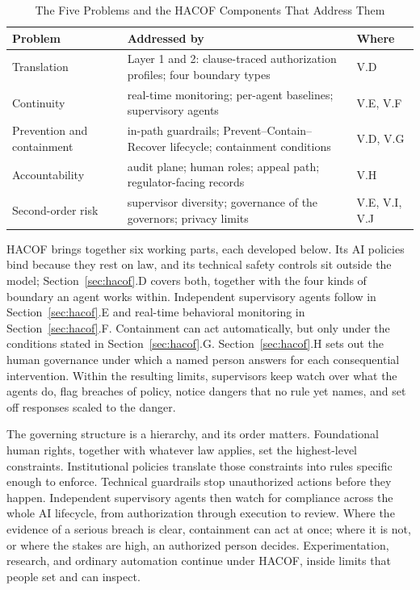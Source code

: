 \documentclass[journal]{IEEEtran}
\newcommand{\hacof}{HACOF}
\begin{document}
\begin{table}[!t]
\caption{The Five Problems and the \hacof{} Components That Address Them}
\label{tab:problems}
\centering
\footnotesize
\setlength{\tabcolsep}{3pt}
\begin{tabular}{>{\raggedright\arraybackslash}p{1.9cm}>{\raggedright\arraybackslash}p{3.6cm}>{\raggedright\arraybackslash}p{1.6cm}}
\toprule
\rowcolor{darkblue!15}
\textbf{Problem} & \textbf{Addressed by} & \textbf{Where} \\
\midrule
Translation & Layer 1 and 2: clause-traced authorization profiles; four boundary types & V.D \\
\rowcolor{darkblue!5}
Continuity & real-time monitoring; per-agent baselines; supervisory agents & V.E, V.F \\
Prevention and containment & in-path guardrails; Prevent--Contain--Recover lifecycle; containment conditions & V.D, V.G \\
\rowcolor{darkblue!5}
Accountability & audit plane; human roles; appeal path; regulator-facing records & V.H \\
Second-order risk & supervisor diversity; governance of the governors; privacy limits & V.E, V.I, V.J \\
\bottomrule
\end{tabular}
\end{table}

\hacof{} brings together six working parts, each developed below. Its AI policies bind because they rest on law, and its technical safety controls sit outside the model; Section~\ref{sec:hacof}.D covers both, together with the four kinds of boundary an agent works within. Independent supervisory agents follow in Section~\ref{sec:hacof}.E and real-time behavioral monitoring in Section~\ref{sec:hacof}.F. Containment can act automatically, but only under the conditions stated in Section~\ref{sec:hacof}.G. Section~\ref{sec:hacof}.H sets out the human governance under which a named person answers for each consequential intervention. Within the resulting limits, supervisors keep watch over what the agents do, flag breaches of policy, notice dangers that no rule yet names, and set off responses scaled to the danger.

The governing structure is a hierarchy, and its order matters. Foundational human rights, together with whatever law applies, set the highest-level constraints. Institutional policies translate those constraints into rules specific enough to enforce. Technical guardrails stop unauthorized actions before they happen. Independent supervisory agents then watch for compliance across the whole AI lifecycle, from authorization through execution to review. Where the evidence of a serious breach is clear, containment can act at once; where it is not, or where the stakes are high, an authorized person decides. Experimentation, research, and ordinary automation continue under \hacof{}, inside limits that people set and can inspect.
\end{document}
